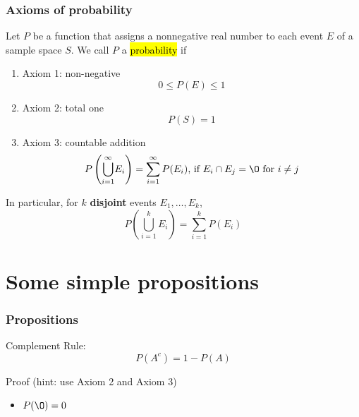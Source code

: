 \documentclass[slidestop,compress,mathserif]{beamer}
\begin{document}
\begin{frame}\frametitle{Axioms of probability}

\vspace{-0.3cm}
\begin{defn}
Let $P$ be a function that assigns a nonnegative real number to each event $E$ of a sample space $S$.
We call $P$ a \hl{probability} if
\pause
\begin{enumerate}
\item Axiom 1: non-negative \[0 \leq P(E)  \leq 1\]
\vspace{-0.7cm}
\pause
\item Axiom 2: total one \[P(S) =  1\]
\vspace{-0.7cm}
\pause
\item Axiom 3: countable addition
\[P\left(\underset{i=1}{\overset{\infty}{\bigcup}} E_i\right) = \sum_{i=1}^\infty P(E_i) \text{,  if } E_i \cap E_j=\O \text{ for } i \neq j  \]
\end{enumerate}
\end{defn}
\pause
In particular, for $k$ {\bf disjoint} events $E_1, \ldots, E_k$,
\[P\left(\underset{i=1}{\overset{k}{\bigcup}} E_i\right) = \sum_{i=1}^k P(E_i)\]
\end{frame}

%

\section{Some simple propositions}
\begin{frame}\frametitle{Propositions}
\begin{dinglist}{\DingListSymbolA}
\item Complement Rule:
\[P(A^c) = 1-P(A)\]
\end{dinglist}
Proof (hint: use Axiom 2 and Axiom 3)


\vspace{3cm}
\pause
\begin{itemize}
\item $ P(\O) = 0 $
\end{itemize}

\end{frame}
\end{document}
